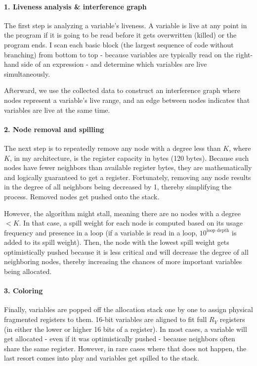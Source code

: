 \documentclass{article}
\begin{document}
\paragraph{1. Liveness analysis \& interference graph}
The first step is analyzing a variable's liveness. A variable is live at any point in the program if it is going to be read before it gets overwritten (killed) or the program ends. I scan each basic block (the largest sequence of code without branching) from bottom to top - because variables are typically read on the right-hand side of an expression - and determine which variables are live simultaneously.

Afterward, we use the collected data to construct an interference graph where nodes represent a variable's live range, and an edge between nodes indicates that variables are live at the same time.

\paragraph{2. Node removal and spilling}
The next step is to repeatedly remove any node with a degree less than $K$, where $K$, in my architecture, is the register capacity in bytes (120 bytes). Because such nodes have fewer neighbors than available register bytes, they are mathematically and logically guaranteed to get a register. Fortunately, removing any node results in the degree of all neighbors being decreased by 1, thereby simplifying the process. Removed nodes get pushed onto the stack.

However, the algorithm might stall, meaning there are no nodes with a degree $< K$. In that case, a spill weight for each node is computed based on its usage frequency and presence in a loop (if a variable is read in a loop, $10^{\text{loop depth}}$ is added to its spill weight). Then, the node with the lowest spill weight gets optimistically pushed because it is less critical and will decrease the degree of all neighboring nodes, thereby increasing the chances of more important variables being allocated.

\paragraph{3. Coloring}
Finally, variables are popped off the allocation stack one by one to assign physical fragmented registers to them. 16-bit variables are aligned to fit full $R_Y$ registers (in either the lower or higher 16 bits of a register). In most cases, a variable will get allocated - even if it was optimistically pushed - because neighbors often share the same register. However, in rare cases where that does not happen, the last resort comes into play and variables get spilled to the stack.
\end{document}
